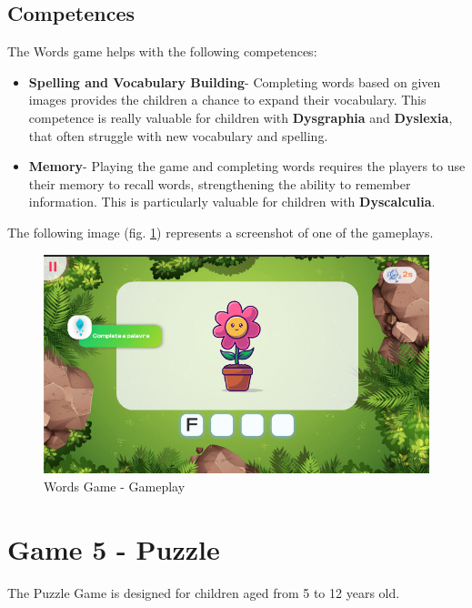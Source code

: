 \subsection*{Competences}
The Words game helps with the following competences:

\begin{itemize}
    \item \textbf{Spelling and Vocabulary Building}- Completing words based on given images provides the children a chance to expand their vocabulary. This competence is really valuable for children with \textbf{Dysgraphia} and \textbf{Dyslexia}, that often struggle with new vocabulary and spelling.

    \item \textbf{Memory}- Playing the game and completing words requires the players to use their memory to recall words, strengthening the ability to remember information. This is particularly valuable for children with \textbf{Dyscalculia}.
\end{itemize}

The following image (fig. \ref{fig:wordsGameplay}) represents a screenshot of one of the gameplays.

\begin{figure}[H]
    \centering
    \includegraphics[scale=0.45]{Chapters/gameplay/WordsGame.jpg}
    \caption{Words Game - Gameplay}
    \label{fig:wordsGameplay}    
\end{figure}

\newpage
\section{Game 5 - Puzzle}
\label{c3Puzzle}

The Puzzle Game is designed for children aged from 5 to 12 years old.

